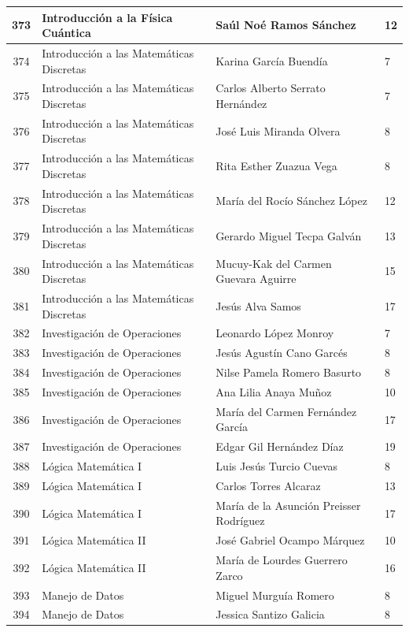 {\begin{longtable}{|c|p{6.5cm}|p{5cm}|p{1.5cm}|}
  373 & Introducción a la Física Cuántica & Saúl Noé Ramos Sánchez & 12 \\ \hline
  374 & Introducción a las Matemáticas Discretas & Karina García Buendía & 7 \\ \hline
  375 & Introducción a las Matemáticas Discretas & Carlos Alberto Serrato Hernández & 7 \\ \hline
  376 & Introducción a las Matemáticas Discretas & José Luis Miranda Olvera & 8 \\ \hline
  377 & Introducción a las Matemáticas Discretas & Rita Esther Zuazua Vega & 8 \\ \hline
  378 & Introducción a las Matemáticas Discretas & María del Rocío Sánchez López & 12 \\ \hline
  379 & Introducción a las Matemáticas Discretas & Gerardo Miguel Tecpa Galván & 13 \\ \hline
  380 & Introducción a las Matemáticas Discretas & Mucuy-Kak del Carmen Guevara Aguirre & 15 \\ \hline
  381 & Introducción a las Matemáticas Discretas & Jesús Alva Samos & 17 \\ \hline
  382 & Investigación de Operaciones & Leonardo López Monroy & 7 \\ \hline
  383 & Investigación de Operaciones & Jesús Agustín Cano Garcés & 8 \\ \hline
  384 & Investigación de Operaciones & Nilse Pamela Romero Basurto & 8 \\ \hline
  385 & Investigación de Operaciones & Ana Lilia Anaya Muñoz & 10 \\ \hline
  386 & Investigación de Operaciones & María del Carmen Fernández García & 17 \\ \hline
  387 & Investigación de Operaciones & Edgar Gil Hernández Díaz & 19 \\ \hline
  388 & Lógica Matemática I & Luis Jesús Turcio Cuevas & 8 \\ \hline
  389 & Lógica Matemática I & Carlos Torres Alcaraz & 13 \\ \hline
  390 & Lógica Matemática I & María de la Asunción Preisser Rodríguez & 17 \\ \hline
  391 & Lógica Matemática II & José Gabriel Ocampo Márquez & 10 \\ \hline
  392 & Lógica Matemática II & María de Lourdes Guerrero Zarco & 16 \\ \hline
  393 & Manejo de Datos & Miguel Murguía Romero & 8 \\ \hline
  394 & Manejo de Datos & Jessica Santizo Galicia & 8 \\ \hline

\end{longtable}}
